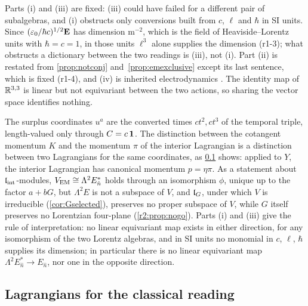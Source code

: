 Parts (i) and (iii) are fixed: (iii) could have failed for a different pair of subalgebras, and (i) obstructs only conversions built
from $c$, $\ell$ and $\hbar$ in SI units. Since $(\varepsilon_0/\hbar c)^{1/2}\mathbf E$ has dimension $\mathrm m^{-2}$, which is the field of
Heaviside--Lorentz units with $\hbar=c=1$, in those units $\ell^3$ alone supplies the dimension (r1-3); what obstructs a dictionary between
the two readings is (iii), not (i). Part (ii) is restated from \cref{prop:notconj} and~\cref{prop:emexclusive} except its last sentence, which is
fixed (r1-4), and (iv) is inherited electrodynamics \cite{HenneauxTeitelboim92}. The identity map of $\mathbb{R}^{3,3}$ is linear but not equivariant between the two
actions, so sharing the vector space identifies nothing.

\begin{remark}
\label{r1:rem:fmb1}
The surplus coordinates $u^a$ are
the converted times $ct^2,ct^3$ of the temporal triple, length-valued only through $C=c\,\mathbf 1$. The distinction between the cotangent momentum $K$ and the momentum $\pi$ of the interior Lagrangian is a distinction between two Lagrangians for the same coordinates, as
\cref{r1:sec:cl} shows: applied to $Y$, the interior Lagrangian has canonical momentum $p=\eta\pi$. As a statement about $\mathfrak l_{\rm int}$-modules,  $V_{\rm EM}\cong\Lambda^2E_{\hat n}^*$ holds through an isomorphism $\phi$, unique up to the factor $a+bG$, but
$\Lambda^2E$ is not a subspace of $V$, and $\mathfrak l_G$, under which $V$ is irreducible (\cref{cor:Gselected}), preserves no proper
subspace of $V$, while $G$ itself preserves no Lorentzian four-plane (\cref{r2:prop:nogo}). Parts (i) and (iii) give the rule of interpretation: no linear equivariant map exists in either
direction, for any isomorphism of the two Lorentz algebras, and in SI units no monomial in $c$, $\ell$, $\hbar$ supplies its dimension; in particular there is no linear equivariant map $\Lambda^2E_{\hat n}^*\to E_{\hat n}$, nor one in the opposite direction.
\end{remark}

\subsection{Lagrangians for the classical reading}
\label{r1:sec:cl}

